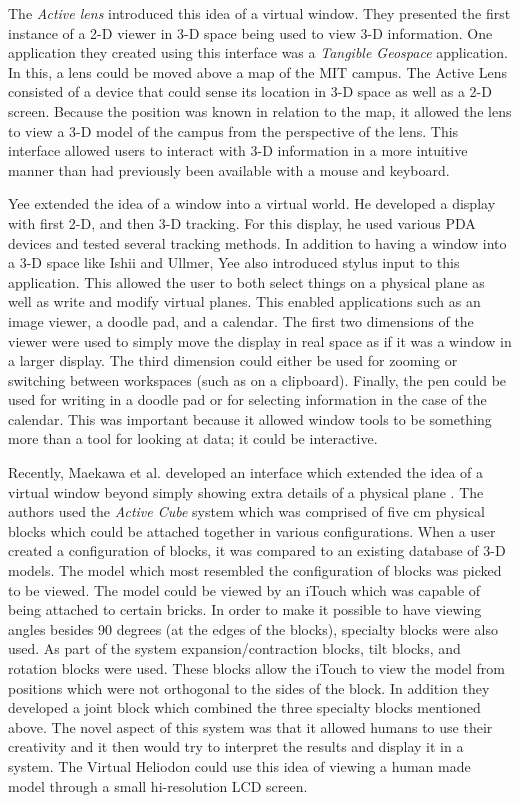 The \emph{Active lens} \cite{Ishii97tangiblebits} introduced this idea of a virtual window.  They presented the first instance of a 2-D viewer in 3-D space being used to view 3-D information.  One application they created using this interface was a \emph{Tangible Geospace} application. In this, a lens could be moved above a map of the MIT campus.  The Active Lens consisted of a device that could sense its location in 3-D space as well as a 2-D screen.  Because the position was known in relation to the map, it allowed the lens to view a 3-D model of the campus from the perspective of the lens.  This interface allowed users to interact with 3-D information in a more intuitive manner than had previously been available with a mouse and keyboard.

Yee \cite{642613} extended the idea of a window into a virtual world.  He developed a display with first 2-D, and then 3-D tracking.  For this display, he used various PDA devices and tested several tracking methods.  In addition to having a window into a 3-D space like Ishii and Ullmer\cite{Ishii97tangiblebits}, Yee also introduced stylus input to this application.  This allowed the user to both select things on a physical plane as well as write and modify virtual planes.  This enabled applications such as an image viewer, a doodle pad, and a calendar.  The first two dimensions of the viewer were used to simply move the display in real space as if it was a window in a larger display.  The third dimension could either be used for zooming or switching between workspaces (such as on a clipboard).  Finally, the pen could be used for writing in a doodle pad or for selecting information in the case of the calendar.  This was important because it allowed window tools to be something more than a tool for looking at data; it could be interactive.

Recently, Maekawa et al. developed an interface which extended the idea of a virtual window beyond simply showing extra details of a physical plane \cite{1517704}.  The authors used the \emph{Active Cube} system which was comprised of five cm physical blocks which could be attached together in various configurations.  When a user created a configuration of blocks, it was compared to an existing database of 3-D models.  The model which most resembled the configuration of blocks was picked to be viewed. The model could be viewed by an iTouch which was capable of being attached to certain bricks.  In order to make it possible to have viewing angles besides 90 degrees (at the edges of the blocks), specialty blocks were also used.  As part of the system expansion/contraction blocks, tilt blocks, and rotation blocks were used.  These blocks allow the iTouch to view the model from positions which were not orthogonal to the sides of the block. In addition they developed a joint block which combined the three specialty blocks mentioned above.  The novel aspect of this system was that it allowed humans to use their creativity and it then would try to interpret the results and display it in a system. The Virtual Heliodon could use this idea of viewing a human made model through a small hi-resolution LCD screen.

